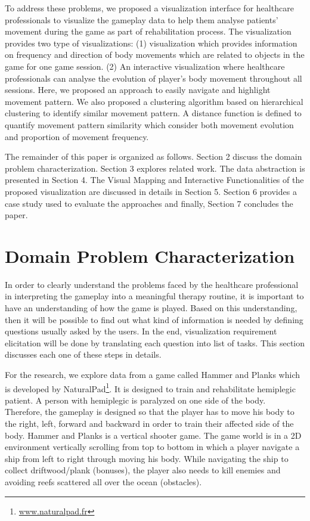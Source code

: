 \documentclass{vgtc}                          %
\begin{document}
To address these problems, we proposed a visualization interface for healthcare professionals to visualize the gameplay data to help them analyse patients' movement during the game as part of rehabilitation process. The visualization provides two type of visualizations: (1) visualization which provides information on frequency and direction of body movements which are related to objects in the game for one game session. (2) An interactive visualization where healthcare professionals can analyse the evolution of player's body movement throughout all sessions. Here, we proposed an approach to easily navigate and highlight movement pattern. We also proposed a clustering algorithm based on hierarchical clustering to identify similar movement pattern. A distance function is defined to quantify movement pattern similarity which consider both movement evolution and proportion of movement frequency.

The remainder of this paper is organized as follows. Section 2 discuss the domain problem characterization. Section 3 explores related work. The data abstraction is presented in Section 4. The Visual Mapping and Interactive Functionalities of the proposed visualization are discussed in details in Section 5. Section 6 provides a case study used to evaluate the approaches and finally, Section 7 concludes the paper.

\section{Domain Problem Characterization}

In order to clearly understand the problems faced by the healthcare professional in interpreting the gameplay into a meaningful therapy routine, it is important to have an understanding of how the game is played. Based on this understanding, then it will be possible to find out what kind of information is needed by defining questions usually asked by the users. In the end, visualization requirement elicitation will be done by translating each question into list of tasks. This section discusses each one of these steps in details.

For the research, we explore data from a game called Hammer and Planks which is developed by NaturalPad\footnote{\url{www.naturalpad.fr}}. It is designed to train and rehabilitate hemiplegic patient. A person with hemiplegic is paralyzed on one side of the body. Therefore, the gameplay is designed so that the player has to move his body to the right, left, forward and backward in order to train their affected side of the body. Hammer and Planks is a vertical shooter game. The game world is in a 2D environment vertically scrolling from top to bottom in which a player navigate a ship from left to right through moving his body. While navigating the ship to collect driftwood/plank (bonuses), the player also needs to kill enemies and avoiding reefs scattered all over the ocean (obstacles).
\end{document}
